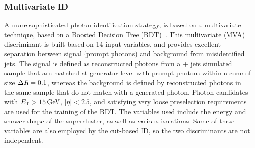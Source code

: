 

\subsubsection{Multivariate ID}
A more sophisticated photon identification strategy, is based on a multivariate technique, based on a Boosted Decision Tree (BDT)~\cite{CMS-EGM-17-001}.
This multivariate (MVA) discriminant is built based on 14 input variables,
and provides excellent separation between signal (prompt photons) and background from misidentified jets.
The signal is defined as reconstructed photons from a \PGg + jets simulated sample that are matched at generator level with prompt photons within a cone of size $\Delta R = 0.1$,
whereas the background is defined by reconstructed photons in the same sample that do not match with a generated photon.
Photon candidates with $E_{\mathrm{T}} > 15 \,\text{Ge\hspace{-.08em}V}$, $|\eta| < 2.5$, and satisfying very loose preselection requirements are used for the training of the BDT.
The variables used include the energy and shower shape of the supercluster, as well as various isolations.
Some of these variables are also employed by the cut-based ID, so the two discriminants are not independent.

